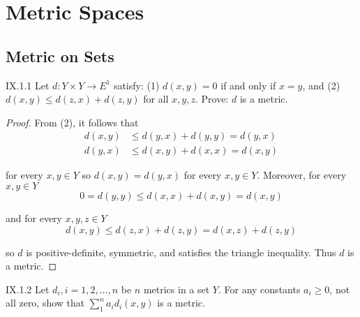 \chapter{Metric Spaces}

\section{Metric on Sets}

\begin{problem}{IX.1.1}
Let \( d: Y \times Y \to E^{1} \) satisfy: (1) \( d(x, y) = 0 \) if and only if \( x = y \), and (2) \( d(x, y) \le d(z, x) + d(z, y) \) for all \( x, y, z \). Prove: \( d \) is a metric.
\end{problem}

\begin{proof}
	From (2), it follows that
	\begingroup
	\allowdisplaybreaks%
	\begin{align*}
		d(x, y) & \le d(y, x) + d(y, y) = d(y, x) \\
		d(y, x) & \le d(x, y) + d(x, x) = d(x, y)
	\end{align*}
	\endgroup

	for every \( x, y \in Y \) so \( d(x, y) = d(y, x) \) for every \( x, y \in Y \). Moreover, for every \( x, y \in Y \)
	\[
		0 = d(y, y) \le d(x, x) + d(x, y) = d(x, y)
	\]

	and for every \( x, y, z \in Y \)
	\[
		d(x, y) \le d(z, x) + d(z, y) = d(x, z) + d(z, y)
	\]

	so \( d \) is positive-definite, symmetric, and satisfies the triangle inequality. Thus \( d \) is a metric.
\end{proof}

\begin{problem}{IX.1.2}
Let \( d_{i}, i = 1, 2, \ldots, n \) be \( n \) metrics in a set \( Y \). For any constants \( a_{i} \ge 0 \), not all zero, show that \( \sum^{n}_{1} a_{i} d_{i}(x, y) \) is a metric.
\end{problem}


